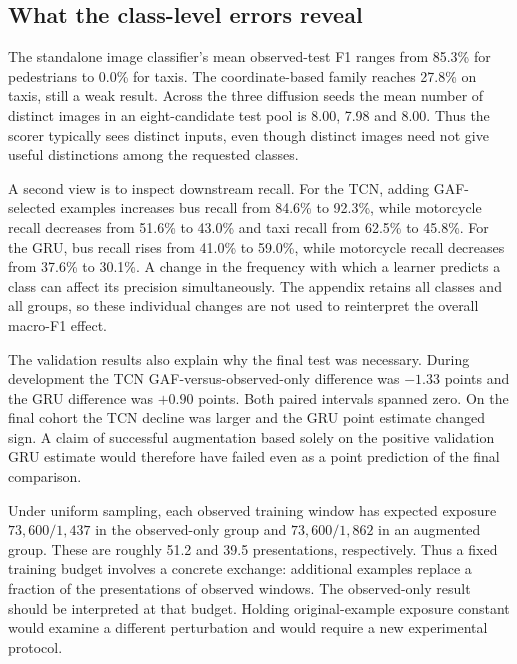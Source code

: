 \subsection{What the class-level errors reveal}
The standalone image classifier's mean observed-test F1 ranges from 85.3\% for pedestrians to 0.0\% for taxis. The coordinate-based family reaches 27.8\% on taxis, still a weak result. Across the three diffusion seeds the mean number of distinct images in an eight-candidate test pool is 8.00, 7.98 and 8.00. Thus the scorer typically sees distinct inputs, even though distinct images need not give useful distinctions among the requested classes.

A second view is to inspect downstream recall. For the TCN, adding GAF-selected examples increases bus recall from 84.6\% to 92.3\%, while motorcycle recall decreases from 51.6\% to 43.0\% and taxi recall from 62.5\% to 45.8\%. For the GRU, bus recall rises from 41.0\% to 59.0\%, while motorcycle recall decreases from 37.6\% to 30.1\%. A change in the frequency with which a learner predicts a class can affect its precision simultaneously. The appendix retains all classes and all groups, so these individual changes are not used to reinterpret the overall macro-F1 effect.

The validation results also explain why the final test was necessary. During development the TCN GAF-versus-observed-only difference was $-1.33$ points and the GRU difference was $+0.90$ points. Both paired intervals spanned zero. On the final cohort the TCN decline was larger and the GRU point estimate changed sign. A claim of successful augmentation based solely on the positive validation GRU estimate would therefore have failed even as a point prediction of the final comparison.

Under uniform sampling, each observed training window has expected exposure $73{,}600/1{,}437$ in the observed-only group and $73{,}600/1{,}862$ in an augmented group. These are roughly 51.2 and 39.5 presentations, respectively. Thus a fixed training budget involves a concrete exchange: additional examples replace a fraction of the presentations of observed windows. The observed-only result should be interpreted at that budget. Holding original-example exposure constant would examine a different perturbation and would require a new experimental protocol.
